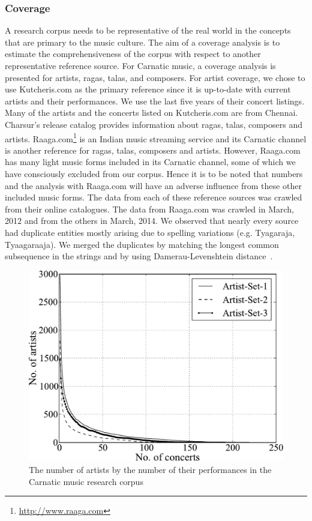 \subsubsection{Coverage}
A research corpus needs to be representative of the real world in the concepts that are primary to the music culture. The aim of a coverage analysis is to estimate the comprehensiveness of the corpus with respect to another representative reference source. For Carnatic music, a coverage analysis is presented for artists, \glspl{raga}, \glspl{tala}, and composers. For artist coverage, we chose to use Kutcheris.com as the primary reference since it is up-to-date with current artists and their performances. We use the last five years of their concert listings. Many of the artists and the concerts listed on Kutcheris.com are from Chennai. Charsur's release catalog provides information about \glspl{raga}, \glspl{tala}, composers and artists. Raaga.com\footnote{\url{http://www.raaga.com}} is an Indian music streaming service and its Carnatic channel is another reference for \glspl{raga}, \glspl{tala}, composers and artists. However, Raaga.com has many light music forms included in its Carnatic channel, some of which we have consciously excluded from our corpus. Hence it is to be noted that numbers and the analysis with Raaga.com will have an adverse influence from these other included music forms. The data from each of these reference sources was crawled from their online catalogues. The data from Raaga.com was crawled in March, 2012 and from the others in March, 2014. We observed that nearly every source had duplicate entities mostly arising due to spelling variations (e.g. Tyagaraja, Tyaagaraaja). We merged the duplicates by matching the longest common subsequence in the strings and by using Damerau-Levenshtein distance~\cite{damerau:64:dist}.
\begin{figure}
	\centering
	\includegraphics[width=\textwidth]{./figs/dstats/performances-vs-artists.pdf}
\caption{The number of artists by the number of their performances in the Carnatic music research corpus}
\label{fig:corpora:perfArtistDistr}
\end{figure}
